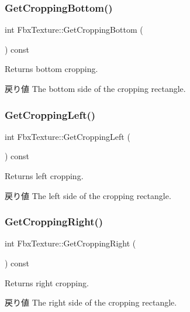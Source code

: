 \subsubsection{\texorpdfstring{Get\+Cropping\+Bottom()}{GetCroppingBottom()}}
{\footnotesize\ttfamily int Fbx\+Texture\+::\+Get\+Cropping\+Bottom (\begin{DoxyParamCaption}{ }\end{DoxyParamCaption}) const}

Returns bottom cropping. \begin{DoxyReturn}{戻り値}
The bottom side of the cropping rectangle. 
\end{DoxyReturn}
\mbox{\label{class_fbx_texture_a8f8e8e8f645cc8cd3f3fabae7e5b6c44}} 
\subsubsection{\texorpdfstring{Get\+Cropping\+Left()}{GetCroppingLeft()}}
{\footnotesize\ttfamily int Fbx\+Texture\+::\+Get\+Cropping\+Left (\begin{DoxyParamCaption}{ }\end{DoxyParamCaption}) const}

Returns left cropping. \begin{DoxyReturn}{戻り値}
The left side of the cropping rectangle. 
\end{DoxyReturn}
\mbox{\label{class_fbx_texture_a4acabeab1c1c4fe031bbd8bd9ace3c64}} 
\subsubsection{\texorpdfstring{Get\+Cropping\+Right()}{GetCroppingRight()}}
{\footnotesize\ttfamily int Fbx\+Texture\+::\+Get\+Cropping\+Right (\begin{DoxyParamCaption}{ }\end{DoxyParamCaption}) const}

Returns right cropping. \begin{DoxyReturn}{戻り値}
The right side of the cropping rectangle. 
\end{DoxyReturn}
\mbox{\label{class_fbx_texture_a1033fe7ba0df6166e17a49d095518c25}} 
